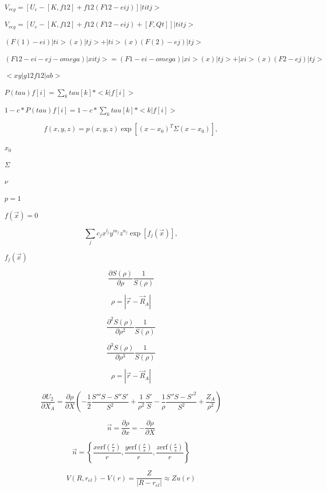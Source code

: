 \documentclass{article}
\begin{document}
$ V_{reg} = [ U_e - [K,f12] + f12(F12-eij) ]|titj> $
\pagebreak

$ V_{reg} = [ U_e - [K,f12] + f12(F12-eij) + [F,Qt] ]|titj> $
\pagebreak

$ (F(1)-ei)|ti> (x) |tj> + |ti> (x) (F(2)-ej)|tj> $
\pagebreak

$ (F12-ei-ej-omega)|xitj> = (F1 - ei - omega)|xi> (x) |tj> + |xi> (x) (F2-ej)|tj> $
\pagebreak

$ <xy|g12f12|ab> $
\pagebreak

$ P(tau)f[i] = \sum_k tau[k]*<k|f[i]>   $
\pagebreak

$ 1-c*P(tau)f[i] = 1 - c*\sum_k tau[k]*<k|f[i]> $
\pagebreak

\[   f(x,y,z) = p(x,y,z) \exp[(x-x_0)^T \Sigma (x-x_0)],
\]
\pagebreak

$x_0$
\pagebreak

$\Sigma$
\pagebreak

$\nu$
\pagebreak

$p=1$
\pagebreak

$f(\vec{x})=0$
\pagebreak

\[\sum_j c_j x^{l_j} y^{m_j} z^{n_j} \exp[f_j(\vec{x})],
\]
\pagebreak

$f_j(\vec{x})$
\pagebreak

\[    \frac{\partial S(\rho)}{\partial \rho} \frac{1}{S(\rho)}
\]
\pagebreak

\[   \rho = |\vec r - \vec R_A |
\]
\pagebreak

\[    \frac{\partial^2 S(\rho)}{\partial \rho^2} \frac{1}{S(\rho)}
\]
\pagebreak

\[    \frac{\partial^3 S(\rho)}{\partial \rho^3} \frac{1}{S(\rho)}
\]
\pagebreak

\[  \rho = \left| \vec r- \vec R_A \right|
\]
\pagebreak

\[\frac{\partial U_2}{\partial X_A} = \frac{\partial \rho}{\partial X}
          \left(-\frac{1}{2}\frac{S''' S - S'' S'}{S^2} + \frac{1}{\rho^2}\frac{S'}{S}
          - \frac{1}{\rho} \frac{S''S - S'^2}{S^2} + \frac{Z_A}{\rho^2}\right)
\]
\pagebreak

\[    \vec n  = \frac{\partial \rho}{\partial x} = -\frac{\partial \rho}{\partial X}
\]
\pagebreak

\[\vec n = \left\{\frac{x \mathrm{erf}\left(\frac{r}{s}\right)}{r},
         \frac{y \mathrm{erf}\left(\frac{r}{s}\right)}{r},
         \frac{z \mathrm{erf}\left(\frac{r}{s}\right)}{r}\right\}
\]
\pagebreak

\[V(R,r_{el}) -V(r) =\frac{Z}{|R-r_{el}|} \approx Z u(r) \]
\pagebreak
\end{document}
